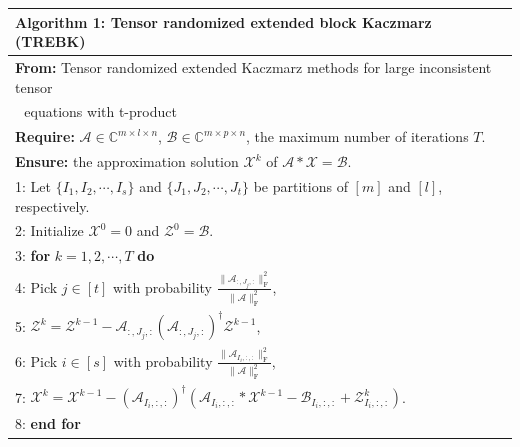\documentclass[aspectratio=169]{beamer}
\begin{document}
\begin{frame}[t]{}
\scriptsize
\setlength{\tabcolsep}{2pt}
\renewcommand{\arraystretch}{1.05}
\begin{center}
\begin{tabular*}{\linewidth}{@{\extracolsep{\fill}}l@{}}
\toprule
{\bf Algorithm 1:} Tensor randomized extended block Kaczmarz (TREBK)\\
\midrule
{\bf From:} Tensor randomized extended Kaczmarz methods for large inconsistent tensor\\
\quad\quad\,\, equations with t-product\\[2pt]
{\bf Require:} $\mathcal{A} \in \mathbb{C}^{m\times l\times n}$, $\mathcal{B} \in \mathbb{C}^{m\times p\times n}$, the maximum number of iterations $T$.\\
{\bf Ensure:} the approximation solution $\mathcal{X}^k$ of $\mathcal{A}*\mathcal{X} = \mathcal{B}$.\\
1: Let $\{I_1, I_2, \cdots, I_s\}$ and $\{J_1, J_2, \cdots, J_t\}$ be partitions of $[m]$ and $[l]$, respectively.\\
2: Initialize $\mathcal{X}^0 = 0$ and $\mathcal{Z}^0 = \mathcal{B}$.\\
3: {\bf for} $k = 1, 2, \cdots, T$ {\bf do}\\
4: \quad Pick $j \in [t]$ with probability $\displaystyle\frac{\|\mathcal{A}_{:,J_j,:}\|_{\text{F}}^2}{\|\mathcal{A}\|_{\text{F}}^2}$,\\[8pt]
5: \quad $\displaystyle\mathcal{Z}^k = \mathcal{Z}^{k-1} - \mathcal{A}_{:,J_j,:}(\mathcal{A}_{:,J_j,:})^\dagger \mathcal{Z}^{k-1}$,\\[8pt]
6: \quad Pick $i \in [s]$ with probability $\displaystyle\frac{\|\mathcal{A}_{I_i,:,:}\|_{\text{F}}^2}{\|\mathcal{A}\|_{\text{F}}^2}$,\\[8pt]
7: \quad $\displaystyle\mathcal{X}^k = \mathcal{X}^{k-1} - (\mathcal{A}_{I_i,:,:})^\dagger(\mathcal{A}_{I_i,:,:}*\mathcal{X}^{k-1} - \mathcal{B}_{I_i,:,:} + \mathcal{Z}^k_{I_i,:,:})$.\\[4pt]
8: {\bf end for}\\
\bottomrule
\end{tabular*}
\end{center}
\end{frame}
\end{document}
